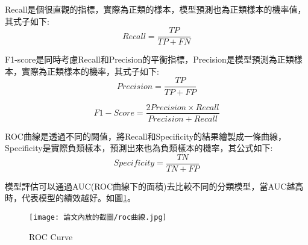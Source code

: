 \noindent Recall是個很直觀的指標，實際為正類的樣本，模型預測也為正類樣本的機率值，其式子如下:
	$$ Recall = \dfrac{TP}{TP+FN} $$
	
\noindent F1-score是同時考慮Recall和Precision的平衡指標，Precision是模型預測為正類樣本，實際為正類樣本的機率，其式子如下:
	$$ Precision = \dfrac{TP}{TP+FP} $$

	$$ F1-Score = \dfrac{2Precision\times Recall}{Precision+Recall} $$
	
\noindent ROC曲線是透過不同的闕值，將Recall和Specificity的結果繪製成一條曲線，Specificity是實際負類樣本，預測出來也為負類樣本的機率，其公式如下:
	$$ Specificity = \dfrac{TN}{TN+FP} $$
	
模型評估可以通過AUC(ROC曲線下的面積)去比較不同的分類模型，當AUC越高時，代表模型的績效越好。如圖\ref{Fi3g15}。

	\begin{figure}[H]
	\centering
	\texttt{[image: 論文內放的截圖/roc曲線.jpg]}
	\caption{ROC Curve}
	\label{Fi3g15}
	\end{figure}

%












